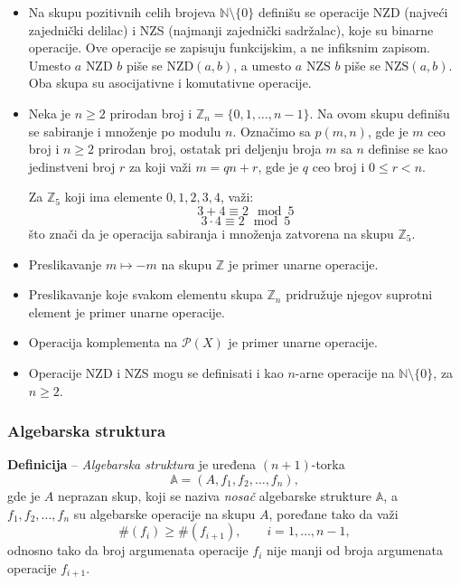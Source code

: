 \documentclass[a4paper,12pt]{article}
\begin{document}
\begin{itemize}
\begin{itemize}
\item Na skupu pozitivnih celih brojeva \(\mathbb{N}\setminus\{0\}\) definišu se
operacije NZD (najveći zajednički delilac) i NZS (najmanji zajednički sadržalac),
koje su binarne operacije. Ove operacije se zapisuju funkcijskim, a ne infiksnim zapisom.
Umesto \(a \text{ NZD } b\) piše se \(\text{NZD}(a,b)\), a umesto \(a \text{ NZS } b\)
piše se \(\text{NZS}(a,b)\). Oba skupa su asocijativne i komutativne operacije.

\item Neka je \(n \ge 2\) prirodan broj i \(\mathbb{Z}_n = \{0,1,\dots,n-1\}\).
Na ovom skupu definišu se sabiranje i množenje po modulu \(n\).
Označimo sa \( p(m, n) \), gde je \( m \) ceo broj i \( n \ge 2 \) prirodan broj, ostatak pri deljenju
broja \( m \) sa \( n \) definise se kao jedinstveni broj \( r \) za koji važi \( m = qn + r \), gde je \( q \) ceo broj i \( 0 \le r < n \).

Za \(\mathbb{Z}_5\) koji ima elemente \(0, 1, 2, 3, 4\), važi:
\[
  3 + 4 \equiv 2 \mod 5
\]
\[  3 \cdot 4 \equiv 2 \mod 5 \]
što znači da je operacija sabiranja i množenja zatvorena na skupu \(\mathbb{Z}_5\).

\item Preslikavanje \(m \mapsto -m\) na skupu \(\mathbb{Z}\) je primer unarne operacije.

\item Preslikavanje koje svakom elementu skupa \(\mathbb{Z}_n\) pridružuje njegov
suprotni element je primer unarne operacije.

\item Operacija komplementa na \(\mathcal{P}(X)\) je primer unarne operacije.

\item Operacije NZD i NZS mogu se definisati i kao \(n\)-arne operacije na
\(\mathbb{N}\setminus\{0\}\), za \(n \ge 2\).
\end{itemize}


\end{itemize}

\subsubsection{Algebarska struktura}

\textbf{Definicija} -- \emph{Algebarska struktura} je uređena $(n+1)$-torka
\[
\mathbb{A}=(A,f_1,f_2,\dots,f_n),
\]
gde je $A$ neprazan skup, koji se naziva \emph{nosač} algebarske strukture $\mathbb{A}$,
a $f_1,f_2,\dots,f_n$ su algebarske operacije na skupu $A$, poređane tako da važi
\[
\#(f_i)\ge \#(f_{i+1}), \qquad i=1,\dots,n-1,
\]
odnosno tako da broj argumenata operacije $f_i$ nije manji od broja argumenata
operacije $f_{i+1}$.
\end{document}
